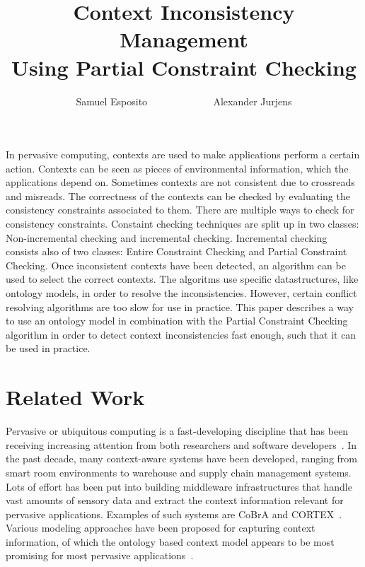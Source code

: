 \documentclass[journal]{vgtc}                %
\title{Context Inconsistency Management \\Using Partial Constraint Checking}
\author{Samuel Esposito ~~~~~~~~~~~~ Alexander Jurjens}
\begin{document}


\maketitle

In pervasive computing, contexts are used to make applications perform a certain action. Contexts can be seen as pieces of environmental information, which the applications depend on. Sometimes contexts are not consistent due to crossreads and misreads. The correctness of the contexts can be checked by evaluating the consistency constraints associated to them. There are multiple ways to check for consistency constraints. Constaint checking techniques are split up in two classes: Non-incremental checking and incremental checking. Incremental checking consists also of two classes: Entire Constraint Checking and Partial Constraint Checking. Once inconsistent contexts have been detected, an algorithm can be used to select the correct contexts. The algoritms use specific datastructures, like ontology models, in order to resolve the inconsistencies. However, certain conflict resolving algorithms are too slow for use in practice. This paper describes a way to use an ontology model in combination with the Partial Constraint Checking algorithm in order to detect context inconsistencies fast enough, such that it can be used in practice.

\section{Related Work}
Pervasive or ubiquitous computing is a fast-developing discipline that has been receiving increasing attention from both researchers and software developers~\cite{xu:2010:PCC}. In the past decade, many context-aware systems have been developed, ranging from smart room environments to warehouse and supply chain management systems. Lots of effort has been put into building middleware infrastructures that handle vast amounts of sensory data and extract the context information relevant for pervasive applications. Examples of such systems are CoBrA and CORTEX~\cite{bu:2006:CCM}. Various modeling approaches have been proposed for capturing context information, of which the ontology based context model appears to be most promising for most pervasive applications~\cite{bu:2006:CCM}.
\end{document}
